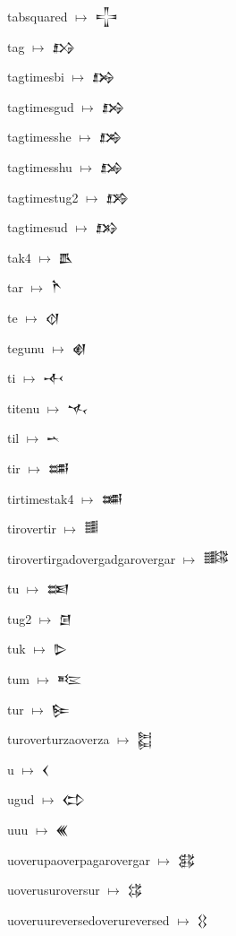 {\noindent tabsquared $\mapsto$ {\cufont 𒋲}\par
\noindent tag $\mapsto$ {\cufont 𒋳}\par
\noindent tagtimesbi $\mapsto$ {\cufont 𒋴}\par
\noindent tagtimesgud $\mapsto$ {\cufont 𒋵}\par
\noindent tagtimesshe $\mapsto$ {\cufont 𒋶}\par
\noindent tagtimesshu $\mapsto$ {\cufont 𒋷}\par
\noindent tagtimestug2 $\mapsto$ {\cufont 𒋸}\par
\noindent tagtimesud $\mapsto$ {\cufont 𒋹}\par
\noindent tak4 $\mapsto$ {\cufont 𒋺}\par
\noindent tar $\mapsto$ {\cufont 𒋻}\par
\noindent te $\mapsto$ {\cufont 𒋼}\par
\noindent tegunu $\mapsto$ {\cufont 𒋽}\par
\noindent ti $\mapsto$ {\cufont 𒋾}\par
\noindent titenu $\mapsto$ {\cufont 𒋿}\par
\noindent til $\mapsto$ {\cufont 𒌀}\par
\noindent tir $\mapsto$ {\cufont 𒌁}\par
\noindent tirtimestak4 $\mapsto$ {\cufont 𒌂}\par
\noindent tirovertir $\mapsto$ {\cufont 𒌃}\par
\noindent tirovertirgadovergadgarovergar $\mapsto$ {\cufont 𒌄}\par
\noindent tu $\mapsto$ {\cufont 𒌅}\par
\noindent tug2 $\mapsto$ {\cufont 𒌆}\par
\noindent tuk $\mapsto$ {\cufont 𒌇}\par
\noindent tum $\mapsto$ {\cufont 𒌈}\par
\noindent tur $\mapsto$ {\cufont 𒌉}\par
\noindent turoverturzaoverza $\mapsto$ {\cufont 𒌊}\par
\noindent u $\mapsto$ {\cufont 𒌋}\par
\noindent ugud $\mapsto$ {\cufont 𒌌}\par
\noindent uuu $\mapsto$ {\cufont 𒌍}\par
\noindent uoverupaoverpagarovergar $\mapsto$ {\cufont 𒌎}\par
\noindent uoverusuroversur $\mapsto$ {\cufont 𒌏}\par
\noindent uoveruureversedoverureversed $\mapsto$ {\cufont 𒌐}\par
}
